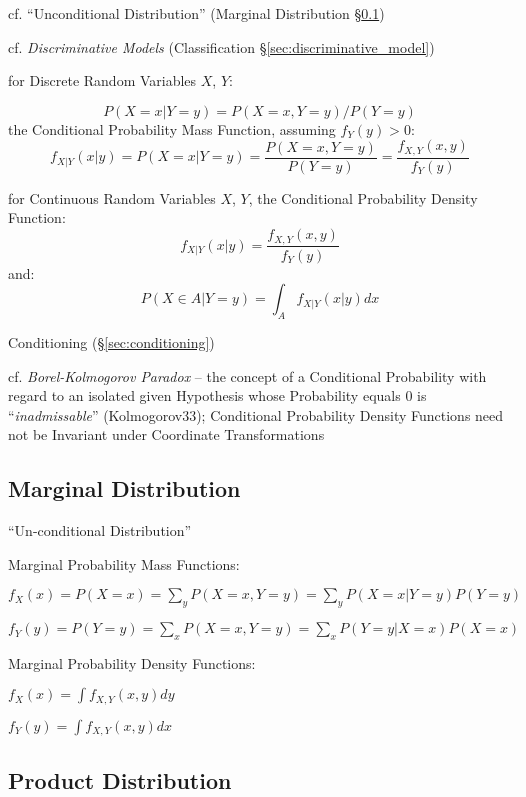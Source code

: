 cf. ``Unconditional Distribution'' (Marginal Distribution
\S\ref{sec:marginal_distribution})

cf. \emph{Discriminative Models} (Classification
\S\ref{sec:discriminative_model})

for Discrete Random Variables $X$, $Y$:

\[
  P(X = x | Y = y) = P(X = x, Y = y)/P(Y = y)
\]
the Conditional Probability Mass Function, assuming $f_Y(y) > 0$:
\[
  f_{X|Y}(x|y) = P(X = x|Y = y) =
    \frac{P(X = x, Y = y)}{P(Y = y)} =
    \frac{f_{X,Y}(x,y)}{f_Y(y)}
\]

for Continuous Random Variables $X$, $Y$, the Conditional Probability Density
Function:
\[
  f_{X|Y}(x|y) = \frac{f_{X,Y}(x,y)}{f_Y(y)}
\]
and:
\[
  P(X \in A| Y = y) = \int_A f_{X|Y}(x|y) dx
\]

\fist Conditioning (\S\ref{sec:conditioning})

cf. \emph{Borel-Kolmogorov Paradox} -- the concept of a Conditional Probability
with regard to an isolated given Hypothesis whose Probability equals $0$ is
``\emph{inadmissable}'' (Kolmogorov33); Conditional Probability Density
Functions need not be Invariant under Coordinate Transformations



\subsection{Marginal Distribution}\label{sec:marginal_distribution}

``Un-conditional Distribution''

Marginal Probability Mass Functions:

$f_X(x) = P(X = x) = \sum_y P(X = x, Y = y) = \sum_y P(X = x | Y = y) P(Y = y)$

$f_Y(y) = P(Y = y) = \sum_x P(X = x, Y = y) = \sum_x P(Y = y | X = x) P(X = x)$

Marginal Probability Density Functions:

$f_X(x) = \int f_{X,Y}(x,y) dy$

$f_Y(y) = \int f_{X,Y}(x,y) dx$



\subsection{Product Distribution}\label{sec:product_distribution}

